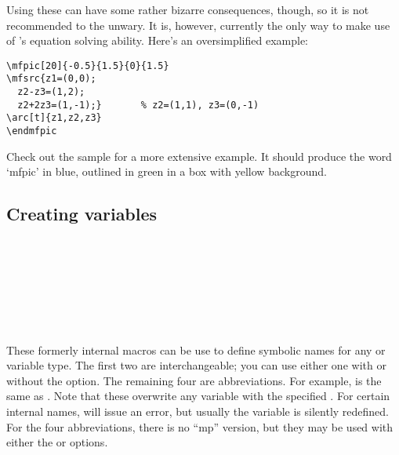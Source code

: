 \documentclass[letterpaper]{article}
\begin{document}
Using these can have some rather bizarre consequences, though, so it is
not recommended to the unwary. It is, however, currently the only way to
make use of \MF{}'s equation solving ability. Here's an oversimplified
example:
\begin{verbatim}
\mfpic[20]{-0.5}{1.5}{0}{1.5}
\mfsrc{z1=(0,0);
  z2-z3=(1,2);
  z2+2z3=(1,-1);}       % z2=(1,1), z3=(0,-1)
\arc[t]{z1,z2,z3}
\endmfpic
\end{verbatim}

Check out the sample  for a more extensive example. It
should produce the word `\textsf{mfpic}' in blue, outlined in green in a
box with yellow background.

\subsection{Creating \MF{} variables}\label{variables}

\begin{cd}
\\
\\
\\
\\
   \\
\\
%
%
%
%
%
%
%
\end{cd}

These formerly internal \mfp{} macros can be use to define symbolic
names for any \MF{} or \MP{} variable type. The first two are
interchangeable; you can use either one with or without the
 option. The remaining four are abbreviations. For
example,  is the same as
. Note that these
overwrite any variable with the specified . For certain
internal names, \MF{} will issue an error, but usually the variable is
silently redefined. For the four abbreviations, there is no ``mp''
version, but they may be used with either the  or
 options.
\end{document}
